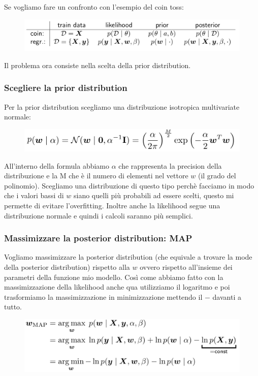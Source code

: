 \documentclass[14pt]{extreport}
\begin{document}
Se vogliamo fare un confronto con l'esempio del coin toss:
\begin{figure}[H]
	\centering
	\includegraphics[width=0.7\linewidth]{118.jpeg}
\end{figure}

Il problema ora consiste nella scelta della prior distribution.
\subsubsection{Scegliere la prior distribution}

Per la prior distribution scegliamo una distribuzione isotropica multivariate normale:

\begin{figure}[H]
	\centering
	\includegraphics[width=0.6\linewidth]{119.jpeg}
\end{figure}

All'interno della formula abbiamo $\alpha$ che rappresenta la precision della distribuzione e la M che è il numero di elementi nel vettore $w$ (il
grado del polinomio). Scegliamo una distribuzione di questo tipo perchè facciamo in modo che i valori bassi di $w$ siano quelli più probabili ad
essere scelti, questo mi permette di evitare l'overfitting. Inoltre anche la likelihood segue una distribuzione normale e quindi i calcoli saranno più
semplici.


\subsubsection{Massimizzare la posterior distribution: MAP}

Vogliamo massimizzare la posterior distribution (che equivale a trovare la mode della posterior distribution) rispetto alla $w$ ovvero rispetto
all'insieme dei parametri della funzione mio modello. Così come abbiamo fatto con la massimizzazione della likelihood anche qua utilizziamo il
logaritmo e poi trasformiamo la massimizzazione in minimizzazione mettendo il $-$ davanti a tutto.

\begin{figure}[H]
	\centering
	\includegraphics[width=0.7\linewidth]{120.jpeg}
\end{figure}
\end{document}
